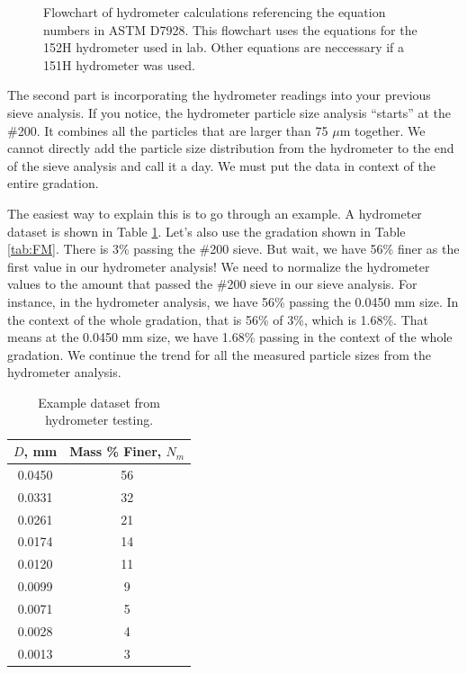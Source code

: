 \documentclass[12pt]{article}
\begin{document}
\begin{figure}[H]
\centering
    \caption{Flowchart of hydrometer calculations referencing the equation numbers in ASTM D7928. This flowchart uses the equations for the 152H hydrometer used in lab. Other equations are neccessary if a 151H hydrometer was used.}
    \label{fig:D7928flowchart}
\end{figure}

The second part is incorporating the hydrometer readings into your previous sieve analysis. If you notice, the hydrometer particle size analysis ``starts'' at the \#200. It combines all the particles that are larger than 75 $\mu$m together. We cannot directly add the particle size distribution from the hydrometer to the end of the sieve analysis and call it a day. We must put the data in context of the entire gradation.

The easiest way to explain this is to go through an example. A hydrometer dataset is shown in Table \ref{tab:hydrometer}. Let's also use the gradation shown in Table \ref{tab:FM}. There is 3\% passing the \#200 sieve. But wait, we have 56\% finer as the first value in our hydrometer analysis! We need to normalize the hydrometer values to the amount that passed the \#200 sieve in our sieve analysis. For instance, in the hydrometer analysis, we have 56\% passing the 0.0450 mm size. In the context of the whole gradation, that is 56\% of 3\%, which is 1.68\%. That means at the 0.0450 mm size, we have 1.68\% passing in the context of the whole gradation. We continue the trend for all the measured particle sizes from the hydrometer analysis. 

\begin{table}[H]
    \centering
        \caption{Example dataset from hydrometer testing.}
    \label{tab:hydrometer}
    \begin{tabular}{cc}
\hline
$D$, mm & Mass \% Finer, $N_m$ \\ \hline
0.0450 & 56\\
0.0331 & 32\\
0.0261 & 21\\
0.0174 & 14\\
0.0120 & 11\\
0.0099 & 9\\
0.0071 & 5\\
0.0028 & 4\\
0.0013 & 3\\ \hline
\end{tabular}
\end{table}
\end{document}
